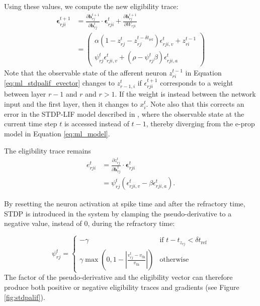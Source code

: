 	        Using these values, we compute the new eligibility trace:
	        \begin{align}
	        \bm{\epsilon}^{t+1}_{rji} &= \frac{\partial\mathbf{h}^{t+1}_{rj}}{\partial\mathbf{h}^t_{rj}}\cdot\bm{\epsilon}^t_{rji} + \frac{\partial\mathbf{h}^{t+1}_{rj}}{\partial W_{rji}}\\
	        &= \begin{pmatrix}
	        \alpha\left(1 - z^t_{rj} - z_{rj}^{t-\delta t_\text{ref}}\right)\epsilon_{rji, v}^t + z_{ri}^{t-1}\\
	        \psi^t_{rj}\epsilon^t_{rji, v} + \left(\rho - \psi^t_{rj}\beta\right)\epsilon^t_{rji,a}
	        \end{pmatrix}\label{eq:ml_stdpalif_evector}
	        \end{align}
	        Note that the observable state of the afferent neuron $z_{ri}^{t-1}$ in Equation \ref{eq:ml_stdpalif_evector} changes to $z_{r-1, i}^t$ if $\epsilon^{t+1}_{rji}$ corresponds to a weight between layer $r-1$ and $r$ and $r > 1$.
	        If the weight is instead between the network input and the first layer, then it changes to $x^t_i$.
	        Note also that this corrects an error in the STDP-LIF model described in \citet{traub2020learning}, where the observable state at the current time step $t$ is accessed instead of $t-1$, thereby diverging from the e-prop model in Equation \ref{eq:ml_model}.

	        The eligibility trace remains
	        \begin{align}
	        e^{t}_{rji} &= \frac{\partial z^{t}_{rj}}{\partial\mathbf{h}^{t}_{rj}} \cdot \bm{\epsilon}^{t}_{rji}\\
	        &= \psi^t_{rj}\left(\epsilon^t_{rji, v} - \beta\epsilon^t_{rji, a}\right).
	        \end{align}

	        By resetting the neuron activation at spike time and after the refractory time, STDP is introduced in the system by clamping the pseudo-derivative to a negative value, instead of 0, during the refractory time:

	        \begin{equation}
	        \psi^t_{rj} = \begin{cases}
	        -\gamma&\mbox{if } t - t_{z_{rj}} < \delta t_\text{ref}\\
	        \gamma\max\left(0, 1 - \left|\frac{v^t_{rj}-v_\text{th}}{v_\text{th}}\right|\right)&\mbox{otherwise}
	        \end{cases}
	        \end{equation}
	        The factor of the pseudo-derivative and the eligibility vector can therefore produce both positive or negative eligibility traces and gradients (see Figure \ref{fig:stdpalif}).

